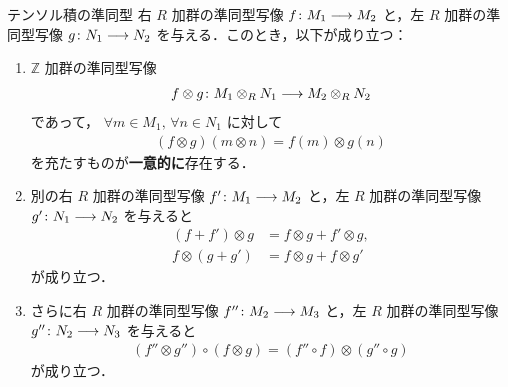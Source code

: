 \documentclass[algtopo_main]{subfiles}
\begin{document}
\begin{mycol}[label=col:univ-tensor1, breakable]{テンソル積の準同型}
	右 $R$ 加群の準同型写像 $f \colon M_1 \longrightarrow M_2$ と，左 $R$ 加群の準同型写像 $g \colon N_1 \longrightarrow N_2$ を与える．このとき，以下が成り立つ：
	\begin{enumerate}
		\item $\mathbb{Z}$ 加群の準同型写像
		\begin{align}
			f \otimes g \colon M_1 \otimes_R N_1\longrightarrow M_2 \otimes_R N_2
		\end{align}
		であって，
		$\forall m \in M_1,\, \forall n \in N_1$ に対して
		\begin{align}
			(f \otimes g)(m \otimes n) = f(m) \otimes g(n)
		\end{align}
		を充たすものが\textbf{一意的に}存在する．
		\item 別の右 $R$ 加群の準同型写像 $f' \colon M_1 \longrightarrow M_2$ と，左 $R$ 加群の準同型写像 $g' \colon N_1 \longrightarrow N_2$ を与えると
		\begin{align}
			(f + f') \otimes g &= f \otimes g + f' \otimes g, \\
			f \otimes (g + g') &= f \otimes g + f \otimes g'
		\end{align}
		が成り立つ．
		\item さらに右 $R$ 加群の準同型写像 $f'' \colon M_2 \longrightarrow M_3$ と，左 $R$ 加群の準同型写像 $g'' \colon N_2 \longrightarrow N_3$ を与えると
		\begin{align}
			(f'' \otimes g'') \circ (f \otimes g) = (f'' \circ f) \otimes (g'' \circ g)
		\end{align}
		が成り立つ．
	\end{enumerate}
\end{mycol}
\end{document}
